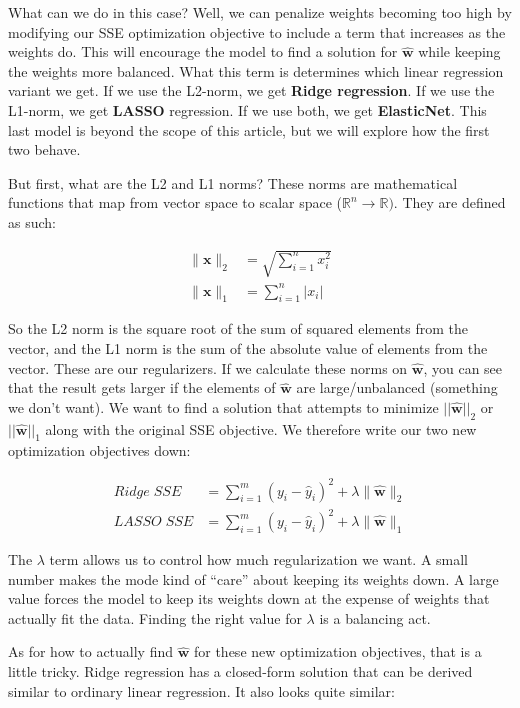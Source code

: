 \begin{flushleft}
    What can we do in this case? Well, we can penalize weights becoming too high by modifying our SSE optimization objective to include a term that increases as the weights do. This will encourage the model to find a solution for $\hat{\textbf{w}}$ while keeping the weights more balanced. What this term is determines which linear regression variant we get. If we use the L2-norm, we get \textbf{Ridge regression}. If we use the L1-norm, we get \textbf{LASSO} regression. If we use both, we get \textbf{ElasticNet}. This last model is beyond the scope of this article, but we will explore how the first two behave. \break

    But first, what are the L2 and L1 norms? These norms are mathematical functions that map from vector space to scalar space ($\mathbb{R}^n \rightarrow \mathbb{R})$. They are defined as such:

    \begin{align*}
      \|\textbf{x}\|_2 &= \sqrt{\sum_{i=1}^n x_i^2} \\
      \|\textbf{x}\|_1 &= \sum_{i=1}^n \vert x_i \vert
    \end{align*}

    So the L2 norm is the square root of the sum of squared elements from the vector, and the L1 norm is the sum of the absolute value of elements from the vector. These are our regularizers. If we calculate these norms on $\hat{\textbf{w}}$, you can see that the result gets larger if the elements of $\hat{\textbf{w}}$ are large/unbalanced (something we don't want). We want to find a solution that attempts to minimize $||\hat{\textbf{w}}||_2$ or $||\hat{\textbf{w}}||_1$ along with the original SSE objective. We therefore write our two new optimization objectives down:

    \begin{align*}
      Ridge\;SSE &= \sum_{i=1}^{m} (y_i - \hat{y}_i)^2 + \lambda\|\hat{\textbf{w}}\|_2 \\
      LASSO\;SSE &= \sum_{i=1}^{m} (y_i - \hat{y}_i)^2 + \lambda\|\hat{\textbf{w}}\|_1
    \end{align*}

    The $\lambda$ term allows us to control how much regularization we want. A small number makes the mode kind of ``care'' about keeping its weights down. A large value forces the model to keep its weights down at the expense of weights that actually fit the data. Finding the right value for $\lambda$ is a balancing act. \break

    As for how to actually find $\hat{\textbf{w}}$ for these new optimization objectives, that is a little tricky. Ridge regression has a closed-form solution that can be derived similar to ordinary linear regression. It also looks quite similar:


\end{flushleft}
